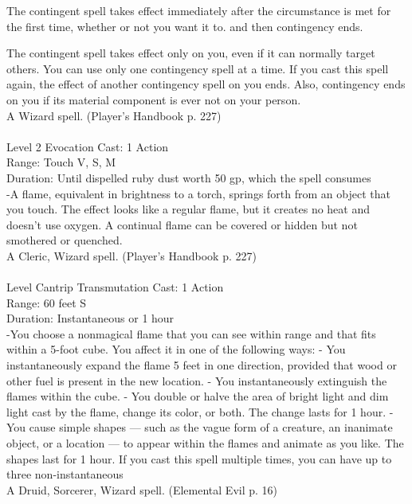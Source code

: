 \documentclass[10pt,twocolumn]{report}
\begin{document}
The contingent spell takes effect immediately after the circumstance is met for the first time, whether or not you want it to. and then contingency ends. 

The contingent spell takes effect only on you, even if it can normally target others. You can use only one contingency spell at a time. If you cast this spell again, the effect of another contingency spell on you ends. Also, contingency ends on you if its material component is ever not on your person.\\
A Wizard spell. (Player's Handbook p. 227) \\


 \\
Level 2 \quad Evocation \quad Cast: 1 Action\\
Range: Touch \quad V, S, M \\
Duration: Until dispelled \quad ruby dust worth 50 gp, which the spell consumes\\
-A flame, equivalent in brightness to a torch, springs forth from an object that you touch. 
The effect looks like a regular flame, but it creates no heat and doesn’t use oxygen. A continual flame can be covered or hidden but not smothered or quenched.\\
A Cleric, Wizard spell. (Player's Handbook p. 227) \\


 \\
Level Cantrip \quad Transmutation \quad Cast: 1 Action\\
Range: 60 feet \quad S\\
Duration: Instantaneous or 1 hour \quad \\
-You choose a nonmagical flame that you can see within range and that fits within a 5-foot cube. You affect it in one of the following ways:
- You instantaneously expand the flame 5 feet in one direction, provided that wood or other fuel is present in the new location.
- You instantaneously extinguish the flames within the cube.
- You double or halve the area of bright light and dim light cast by the flame, change its color, or both. The change lasts for 1 hour.
- You cause simple shapes — such as the vague form of a creature, an inanimate object, or a location — to appear within the flames and animate as you like. The shapes last for 1 hour.
If you cast this spell multiple times, you can have up to three non-instantaneous\\
A Druid, Sorcerer, Wizard spell. (Elemental Evil p. 16) \\
\end{document}
